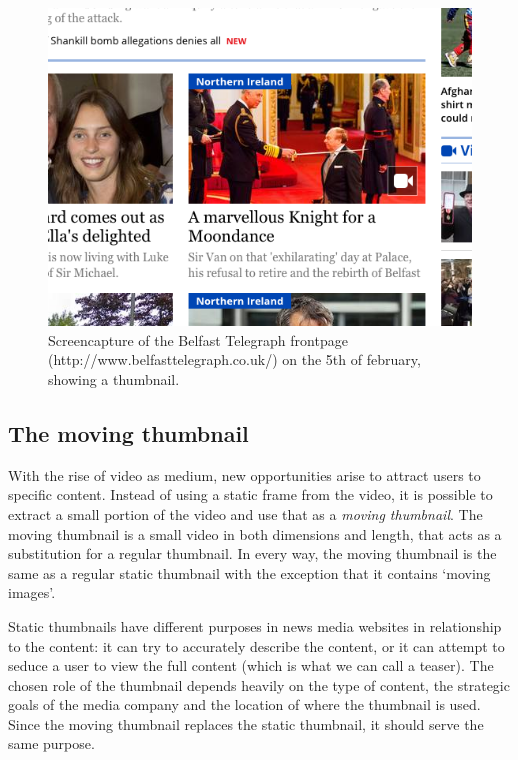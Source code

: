 \documentclass{../resources/acm_proc_article-sp}
\begin{document}
\begin{figure}[h]
  \includegraphics[width=\linewidth]{images/belfast-telegraph-thumbnail}
  \caption{Screencapture of the Belfast Telegraph frontpage (http://www.belfasttelegraph.co.uk/) on the 5th of february, showing a thumbnail.}
\end{figure}


\subsection{The moving thumbnail}

With the rise of video as medium, new opportunities arise to attract users to specific content. Instead of using a static frame from the video, it is possible to extract a small portion of the video and use that as a \textit{moving thumbnail}. The moving thumbnail is a small video in both dimensions and length, that acts as a substitution for a regular thumbnail. In every way, the moving thumbnail is the same as a regular static thumbnail with the exception that it contains `moving images'.

Static thumbnails have different purposes in news media websites in relationship to the content: it can try to accurately describe the content, or it can attempt to seduce a user to view the full content (which is what we can call a teaser). The chosen role of the thumbnail depends heavily on the type of content, the strategic goals of the media company and the location of where the thumbnail is used. Since the moving thumbnail replaces the static thumbnail, it should serve the same purpose.
\end{document}

